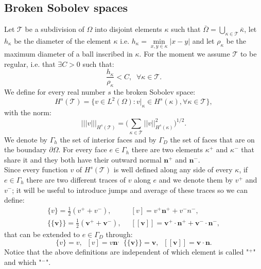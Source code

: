 \documentclass[12pt, a4paper]{article}
\begin{document}
\subsection{Broken Sobolev spaces}
Let $\mathcal{T}$ be a subdivision of $\Omega$ into disjoint elements $\kappa$ such that $ \bar{\Omega} = \bigcup\limits_{\kappa \in \mathcal{T}} \bar{\kappa}$, let $h_\kappa$ be the diameter of the element $\kappa$ i.e. $h_\kappa = \min\limits_{x, y \in \kappa} |x-y|$ and let $\rho_\kappa$ be the maximum diameter of a ball inscribed in $\kappa$. For the moment we assume $\mathcal{T}$ to be regular, i.e. that $\exists C > 0$ such that:
\begin{equation*}
	\frac{h_\kappa}{\rho_\kappa} < C, \; \; \forall \kappa \in \mathcal{T}.
\end{equation*}
We define for every real number $s$ the broken Sobolev space:
\begin{equation*}
	H^s(\mathcal{T}) = \{ v \in L^2(\Omega) : v|_\kappa \in H^s(\kappa), \forall \kappa \in \mathcal{T} \},
\end{equation*}
with the norm:
\begin{equation*}
	|||v|||_{H^s(\mathcal{T})} = \bigg( \sum_{\kappa \in \mathcal{T}} ||v||_{H^s(\kappa)}^2 \bigg)^{1/2}.
\end{equation*}
We denote by $\Gamma_h$ the set of interior faces and by $\Gamma_D$ the set of faces that are on the boundary $\partial \Omega$. For every face $e \in \Gamma_h$ there are two elements $\kappa^+$ and $\kappa^-$ that share it and they both have their outward normal $\mathbf{n}^+$ and $\mathbf{n}^-$.\\
Since every function $v$ of $H^s(\mathcal{T})$ is well defined along any side of every $\kappa$, if $e \in \Gamma_h$ there are two different traces of $v$ along $e$ and we denote them by $v^+$ and $v^-$; it will be useful to introduce jumps and average of these traces so we can define:
\begin{align*}
	\{v\} = \frac{1}{2} (v^+ + v^-) ,
	& \;\; [v] = v^+ \mathbf{n}^+ + v^- {n}^-,\\
	\{\!\!\{ \mathbf{v} \}\!\!\} = \frac{1}{2} (\mathbf{v}^+ +\mathbf{v}^-),
	& \;\; [\![ \mathbf{v} ]\!] = \mathbf{v}^+ \cdot \mathbf{n}^+ + \mathbf{v}^- \cdot \mathbf{n}^-,
\end{align*}
that can be extended to $e \in \Gamma_D$ through:
\begin{equation*}
	\{v\} = v, \;\; [v] = v \mathbf{n}^,
	\;\; \{\!\!\{ \mathbf{v} \}\!\!\} = \mathbf{v}, \;\; [\![ \mathbf{v} ]\!] = \mathbf{v} \cdot \mathbf{n}.
\end{equation*}
Notice that the above definitions are independent of which element is called "$^+$" and which "$^-$".
\end{document}
